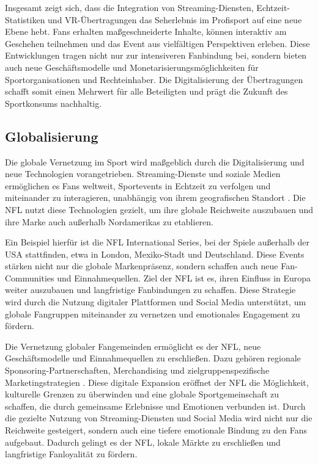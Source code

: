 \documentclass[
  number]{elsarticle}
\begin{document}
Insgesamt zeigt sich, dass die Integration von Streaming-Diensten,
Echtzeit-Statistiken und VR-Übertragungen das Seherlebnis im Profisport
auf eine neue Ebene hebt. Fans erhalten maßgeschneiderte Inhalte, können
interaktiv am Geschehen teilnehmen und das Event aus vielfältigen
Perspektiven erleben. Diese Entwicklungen tragen nicht nur zur
intensiveren Fanbindung bei, sondern bieten auch neue Geschäftsmodelle
und Monetarisierungsmöglichkeiten für Sportorganisationen und
Rechteinhaber. Die Digitalisierung der Übertragungen schafft somit einen
Mehrwert für alle Beteiligten und prägt die Zukunft des Sportkonsums
nachhaltig. \citep[p.~235]{iliescu_streamingahead}

\subsection{Globalisierung}\label{globalisierung}

Die globale Vernetzung im Sport wird maßgeblich durch die
Digitalisierung und neue Technologien vorangetrieben. Streaming-Dienste
und soziale Medien ermöglichen es Fans weltweit, Sportevents in Echtzeit
zu verfolgen und miteinander zu interagieren, unabhängig von ihrem
geografischen Standort \citep[p.~4]{glebova_massdiffusion}\hspace{0pt}.
Die NFL nutzt diese Technologien gezielt, um ihre globale Reichweite
auszubauen und ihre Marke auch außerhalb Nordamerikas zu
etablieren\hspace{0pt}. \citep[p.~27]{ronkko_sportsmarketing}

Ein Beispiel hierfür ist die NFL International Series, bei der Spiele
außerhalb der USA stattfinden, etwa in London, Mexiko-Stadt und
Deutschland. Diese Events stärken nicht nur die globale Markenpräsenz,
sondern schaffen auch neue Fan-Communities und Einnahmequellen. Ziel der
NFL ist es, ihren Einfluss in Europa weiter auszubauen und langfristige
Fanbindungen zu schaffen. Diese Strategie wird durch die Nutzung
digitaler Plattformen und Social Media unterstützt, um globale
Fangruppen miteinander zu vernetzen und emotionales Engagement zu
fördern\hspace{0pt}. \citep{wikipedia_nflinternational}

Die Vernetzung globaler Fangemeinden ermöglicht es der NFL, neue
Geschäftsmodelle und Einnahmequellen zu erschließen. Dazu gehören
regionale Sponsoring-Partnerschaften, Merchandising und
zielgruppenspezifische Marketingstrategien
\citep[p.~230]{iliescu_streamingahead}\hspace{0pt}. Diese digitale
Expansion eröffnet der NFL die Möglichkeit, kulturelle Grenzen zu
überwinden und eine globale Sportgemeinschaft zu schaffen, die durch
gemeinsame Erlebnisse und Emotionen verbunden ist. Durch die gezielte
Nutzung von Streaming-Diensten und Social Media wird nicht nur die
Reichweite gesteigert, sondern auch eine tiefere emotionale Bindung zu
den Fans aufgebaut. Dadurch gelingt es der NFL, lokale Märkte zu
erschließen und langfristige Fanloyalität zu fördern.
\end{document}

